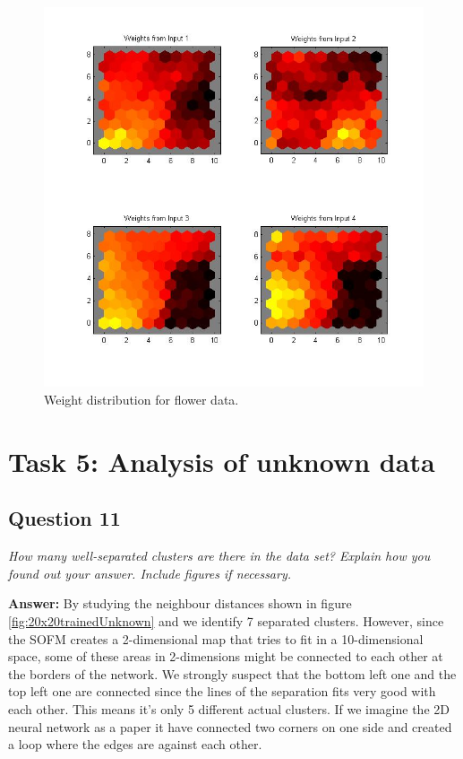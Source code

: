 \documentclass[a4paper]{article}
\begin{document}
  \begin{figure}[H] %
	 \includegraphics[scale=0.45]{q4_q9weightdistribution.jpg}
	 \caption{\label{fig:weightdist} Weight distribution for flower data.}
 \end{figure}
\section*{Task 5: Analysis of unknown data}


\subsection*{Question 11}
\emph{How many well-separated clusters are there in the data set?
Explain how you found out your answer. Include figures if necessary.}


 \textbf{Answer:} By studying the neighbour distances shown in figure \ref{fig:20x20trainedUnknown} and we identify 7 separated clusters. However, since the SOFM creates a 2-dimensional map that tries to fit in a 10-dimensional space, some of these areas in 2-dimensions might be connected to each other at the borders of the network. We strongly suspect that the bottom left one and the top left one are connected since the lines of the separation fits very good with each other. This means it's only 5 different actual clusters. If we imagine the 2D neural network as a paper it have connected two corners on one side and created a loop where the edges are against each other. 
 
\end{document}
